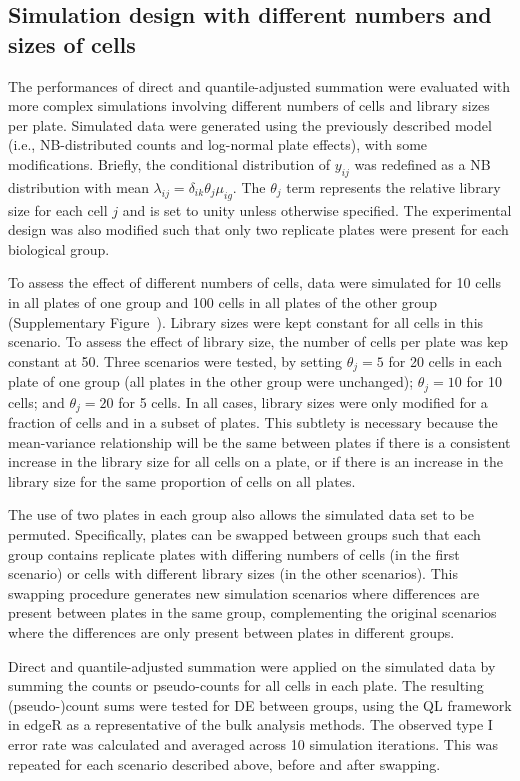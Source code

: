 \documentclass[oupdraft]{bio}
\begin{document}
\subsection{Simulation design with different numbers and sizes of cells}
The performances of direct and quantile-adjusted summation were evaluated with more complex simulations involving different numbers of cells and library sizes per plate.
Simulated data were generated using the previously described model (i.e., NB-distributed counts and log-normal plate effects), with some modifications.
Briefly, the conditional distribution of $y_{ij}$ was redefined as a NB distribution with mean $\lambda_{ij} = \delta_{ik}\theta_{j}\mu_{ig}$.
The $\theta_{j}$ term represents the relative library size for each cell $j$ and is set to unity unless otherwise specified.
The experimental design was also modified such that only two replicate plates were present for each biological group.

To assess the effect of different numbers of cells, data were simulated for 10 cells in all plates of one group and 100 cells in all plates of the other group (Supplementary Figure~\suppcompsim{}).
Library sizes were kept constant for all cells in this scenario.
To assess the effect of library size, the number of cells per plate was kep constant at 50.
Three scenarios were tested, by setting $\theta_j=5$ for 20 cells in each plate of one group (all plates in the other group were unchanged);
    $\theta_j=10$ for 10 cells; and $\theta_j=20$ for 5 cells.
In all cases, library sizes were only modified for a fraction of cells and in a subset of plates.
This subtlety is necessary because the mean-variance relationship will be the same between plates if there is a consistent increase in the library size for all cells on a plate, 
    or if there is an increase in the library size for the same proportion of cells on all plates.

The use of two plates in each group also allows the simulated data set to be permuted.
Specifically, plates can be swapped between groups such that each group contains replicate plates with differing numbers of cells (in the first scenario)
    or cells with different library sizes (in the other scenarios).
This swapping procedure generates new simulation scenarios where differences are present between plates in the same group, 
    complementing the original scenarios where the differences are only present between plates in different groups.

Direct and quantile-adjusted summation were applied on the simulated data by summing the counts or pseudo-counts for all cells in each plate.
The resulting (pseudo-)count sums were tested for DE between groups, using the QL framework in edgeR as a representative of the bulk analysis methods.
The observed type I error rate was calculated and averaged across 10 simulation iterations.
This was repeated for each scenario described above, before and after swapping.
\end{document}
